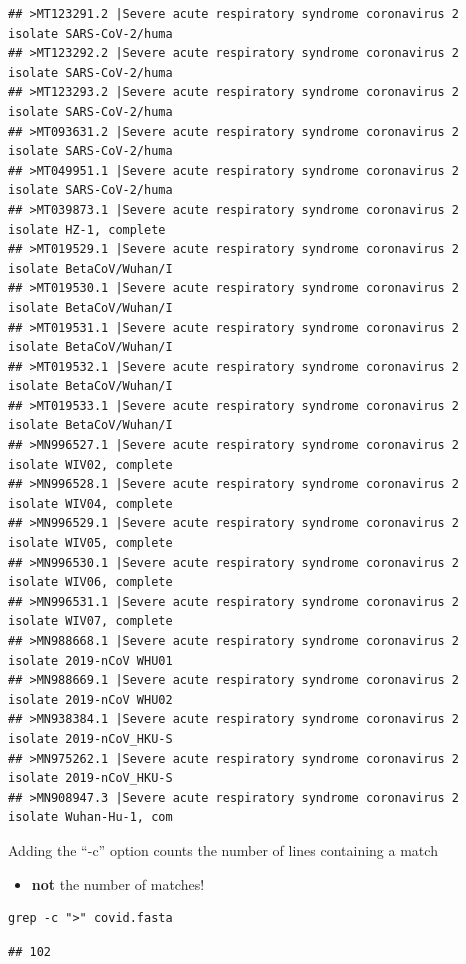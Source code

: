 \documentclass[
]{book}
\providecommand{\tightlist}{%
  \setlength{\itemsep}{0pt}\setlength{\parskip}{0pt}}
\begin{document}
\begin{verbatim}
## >MT123291.2 |Severe acute respiratory syndrome coronavirus 2 isolate SARS-CoV-2/huma
## >MT123292.2 |Severe acute respiratory syndrome coronavirus 2 isolate SARS-CoV-2/huma
## >MT123293.2 |Severe acute respiratory syndrome coronavirus 2 isolate SARS-CoV-2/huma
## >MT093631.2 |Severe acute respiratory syndrome coronavirus 2 isolate SARS-CoV-2/huma
## >MT049951.1 |Severe acute respiratory syndrome coronavirus 2 isolate SARS-CoV-2/huma
## >MT039873.1 |Severe acute respiratory syndrome coronavirus 2 isolate HZ-1, complete
## >MT019529.1 |Severe acute respiratory syndrome coronavirus 2 isolate BetaCoV/Wuhan/I
## >MT019530.1 |Severe acute respiratory syndrome coronavirus 2 isolate BetaCoV/Wuhan/I
## >MT019531.1 |Severe acute respiratory syndrome coronavirus 2 isolate BetaCoV/Wuhan/I
## >MT019532.1 |Severe acute respiratory syndrome coronavirus 2 isolate BetaCoV/Wuhan/I
## >MT019533.1 |Severe acute respiratory syndrome coronavirus 2 isolate BetaCoV/Wuhan/I
## >MN996527.1 |Severe acute respiratory syndrome coronavirus 2 isolate WIV02, complete
## >MN996528.1 |Severe acute respiratory syndrome coronavirus 2 isolate WIV04, complete
## >MN996529.1 |Severe acute respiratory syndrome coronavirus 2 isolate WIV05, complete
## >MN996530.1 |Severe acute respiratory syndrome coronavirus 2 isolate WIV06, complete
## >MN996531.1 |Severe acute respiratory syndrome coronavirus 2 isolate WIV07, complete
## >MN988668.1 |Severe acute respiratory syndrome coronavirus 2 isolate 2019-nCoV WHU01
## >MN988669.1 |Severe acute respiratory syndrome coronavirus 2 isolate 2019-nCoV WHU02
## >MN938384.1 |Severe acute respiratory syndrome coronavirus 2 isolate 2019-nCoV_HKU-S
## >MN975262.1 |Severe acute respiratory syndrome coronavirus 2 isolate 2019-nCoV_HKU-S
## >MN908947.3 |Severe acute respiratory syndrome coronavirus 2 isolate Wuhan-Hu-1, com
\end{verbatim}

Adding the ``-c'' option counts the number of lines containing a match

\begin{itemize}
\tightlist
\item
  \textbf{not} the number of matches!
\end{itemize}

\begin{verbatim}
grep -c ">" covid.fasta
\end{verbatim}

\begin{verbatim}
## 102
\end{verbatim}
\end{document}
